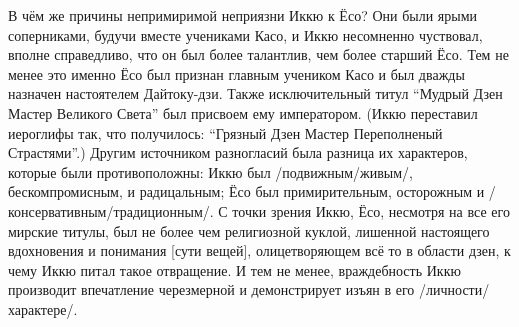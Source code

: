 \begin{ver}
  В чём же причины непримиримой неприязни Иккю к Ёсо? Они были ярыми
  соперниками, будучи вместе учениками Касо, и Иккю несомненно
  чуствовал, вполне справедливо, что он был более талантлив, чем более
  старший Ёсо. Тем не менее это именно Ёсо был признан главным
  учеником Касо и был дважды назначен настоятелем Дайтоку-дзи. Также
  исключительный титул ``Мудрый Дзен Мастер Великого
  Света'' был присвоем
  ему императором. (Иккю переставил иероглифы так, что получилось:
  ``Грязный Дзен Мастер Переполненый Страстями''.) Другим источником
  разногласий была разница их характеров, которые были противоположны:
  Иккю был /подвижным/живым/, бескомпромисным, и радицальным; Ёсо был
  примирительным, осторожным и /консервативным/традиционным/. С точки
  зрения Иккю, Ёсо, несмотря на все его мирские титулы, был не более
  чем религиозной куклой, лишенной настоящего
  вдохновения и понимания [сути вещей], олицетворяющем всё то в
  области дзен, к чему Иккю питал такое отвращение. И тем не менее,
  враждебность Иккю производит впечатление черезмерной и демонстрирует
  изъян в его /личности/характере/.
\end{ver}

